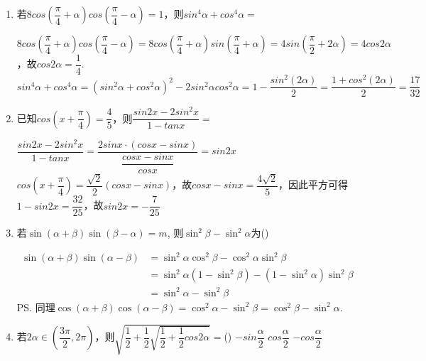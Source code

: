 \begin{enumerate}
\begin{enumerate}
\begin{jieda}
\begin{enumerate}
            \end{enumerate}
        \end{jieda}
        \item 若$8cos(\dfrac{\pi}{4}+\alpha)cos(\dfrac{\pi}{4} - \alpha) = 1$，则$sin^4\alpha+cos^4\alpha = $
        \begin{jieda}
            $8cos(\dfrac{\pi}{4}+\alpha)cos(\dfrac{\pi}{4} - \alpha) = 8cos(\dfrac{\pi}{4}+\alpha)sin(\dfrac{\pi}{4}+\alpha) = 4sin(\dfrac{\pi}{2}+2\alpha) = 4cos2\alpha$，故$cos2\alpha = \dfrac{1}{4}$.
            $sin^4\alpha+cos^4\alpha = (sin^2\alpha+cos^2\alpha)^2 - 2sin^2\alpha cos^2\alpha = 1 - \dfrac{sin^2(2\alpha)}{2} = \dfrac{1+cos^2(2\alpha)}{2} = \dfrac{17}{32}$
        \end{jieda}
        \item 已知$cos(x+\dfrac{\pi}{4}) = \dfrac{4}{5}$，则$\dfrac{sin2x-2sin^2x}{1-tanx} = $
        \begin{jieda}
            $\dfrac{sin2x-2sin^2x}{1-tanx} = \dfrac{2sinx\cdot(cosx - sinx)}{\dfrac{cosx - sinx}{cosx}} = sin2x$ \\
            $cos(x+\dfrac{\pi}{4}) = \dfrac{\sqrt{2}}{2}(cosx - sinx)$，故$cosx - sinx = \dfrac{4\sqrt{2}}{5}$，因此平方可得$1 - sin2x = \dfrac{32}{25}$，故$sin2x = -\dfrac{7}{25}$ 
        \end{jieda}
        \item 若$\sin(\alpha+\beta)\sin(\beta-\alpha)=m$, 则$\sin^2\beta-\sin^2\alpha$为\dotfill()
        \begin{jieda}
        \begin{align*}
        \sin(\alpha+\beta)\sin(\alpha-\beta) 
        & =\sin^2\alpha\cos^2\beta-\cos^2\alpha\sin^2\beta\\
        & =\sin^2\alpha(1-\sin^2\beta)-(1-\sin^2\alpha)\sin^2\beta\\
        & =\sin^2\alpha-\sin^2\beta
        \end{align*}
        \ps 同理$\cos(\alpha+\beta)\cos(\alpha-\beta)=\cos^2\alpha-\sin^2\beta=\cos^2\beta-\sin^2\alpha$. 
        \end{jieda}
        \item 若$2\alpha \in (\dfrac{3\pi}{2}, 2\pi)$，则$\sqrt{\dfrac{1}{2}+\dfrac{1}{2}\sqrt{\dfrac{1}{2}+\dfrac{1}{2}cos2\alpha}} = $\dotfill()
        {$-sin\dfrac{\alpha}{2}$}
        {$cos\dfrac{\alpha}{2}$}
        {$-cos\dfrac{\alpha}{2}$}
        \begin{jieda}

\end{jieda}
\end{enumerate}
\end{enumerate}
